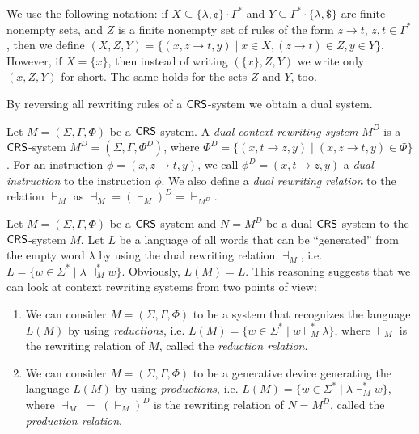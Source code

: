 \begin{remark}\label{remark:setinstructions}
We use the following notation: if $X \subseteq \{\lambda, \cent\}\cdot\Gamma^*$ and $Y \subseteq \Gamma^*\cdot\{\lambda, \$\}$ are finite nonempty sets, and $Z$ is a finite nonempty set of rules of the form $z \to t$, $z, t \in \Gamma^*$, then we define $(X, Z, Y) = \{(x, z \to t, y) \mid x \in X, (z \to t) \in Z, y \in Y \}$. However, if $X = \{ x \}$, then instead of writing $( \{ x \}, Z, Y)$ we write only $(x, Z, Y)$ for short. The same holds for the sets $Z$ and $Y$, too.
\end{remark}

By reversing all rewriting rules of a $\mbox{\sf CRS\/}$-system we obtain a dual system.

\begin{definition}\label{definition:crs-dual}
Let $M=(\Sigma, \Gamma, \Phi)$ be a $\mbox{\sf CRS\/}$-system. A \emph{dual context rewriting system} $M^D$ is a $\mbox{\sf CRS\/}$-system $M^D = (\Sigma, \Gamma, \Phi^D)$, where $\Phi^D = \{(x, t \to z, y) \mid (x, z \to t, y) \in \Phi \}$. For an instruction $\phi = (x, z \to t, y)$, we call $\phi^D = (x, t \to z, y)$ a \emph{dual instruction} to the instruction $\phi$. We also define a \emph{dual rewriting relation} to the relation $\vdash_M$ as $\dashv_M = (\vdash_M)^D = \vdash_{M^D}$.
\end{definition}

\begin{remark}\label{remark:approach}
Let $M=(\Sigma, \Gamma, \Phi)$ be a $\mbox{\sf CRS\/}$-system and $N = M^D$ be a dual $\mbox{\sf CRS\/}$-system to the $\mbox{\sf CRS\/}$-system $M$. Let $L$ be a language of all words that can be ``generated'' from the empty word $\lambda$ by using the dual rewriting relation $\dashv_M$, i.e. $L = \{w \in \Sigma^* \mid \lambda \dashv_M^* w\}$. Obviously, $L(M) = L$. This reasoning suggests that we can look at context rewriting systems from two points of view:
\begin{enumerate}
\item
We can consider $M=(\Sigma, \Gamma, \Phi)$ to be a system that recognizes the language $L(M)$ by using \emph{reductions}, i.e. $L(M) = \{ w \in \Sigma^* \mid w \vdash^*_M \lambda \}$, where $\vdash_M$ is the rewriting relation of $M$, called the \emph{reduction relation}.
\item
We can consider $M=(\Sigma, \Gamma, \Phi)$ to be a generative device generating the language $L(M)$ by using \emph{productions}, i.e. $L(M) = \{ w \in \Sigma^* \mid \lambda \dashv^*_M w \}$, where $\dashv_M \;= \; (\vdash_M)^D$ is the rewriting relation of $N = M^D$, called the \emph{production relation}.
\end{enumerate}
\end{remark}


